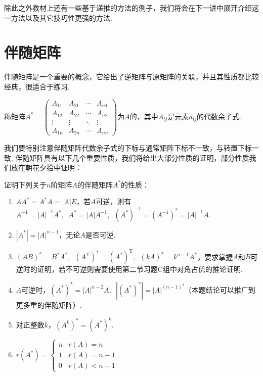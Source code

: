 除此之外教材上还有一些基于递推的方法的例子，我们将会在下一讲中展开介绍这一方法以及其它技巧性更强的方法.

\section{伴随矩阵}

伴随矩阵是一个重要的概念，它给出了逆矩阵与原矩阵的关联，并且其性质都比较经典，很适合于练习.
\begin{definition}
    称矩阵$A^*=\begin{pmatrix}
            A_{11} & A_{21} & \cdots & A_{n1} \\
            A_{12} & A_{22} & \cdots & A_{n2} \\
            \vdots & \vdots & \ddots & \vdots \\
            A_{1n} & A_{2n} & \cdots & A_{nn}
        \end{pmatrix}$为$A$的，其中$A_{ij}$是元素$a_{ij}$的代数余子式.
\end{definition}
我们要特别注意伴随矩阵代数余子式的下标与通常矩阵下标不一致，与转置下标一致. 伴随矩阵具有以下几个重要性质，我们将给出大部分性质的证明，部分性质我们放在朝花夕拾中证明：
\begin{example} \label{ex:13:伴随矩阵}
    证明下列关于$n$阶矩阵$A$的伴随矩阵$A^*$的性质：
    \begin{enumerate}
        \item \label{item:13:伴随矩阵:1}
              $AA^*=A^*A=|A|E$，若$A$可逆，则有$A^{-1}=|A|^{-1}A^*,\enspace A^*=|A|A^{-1},\enspace (A^*)^{-1}=(A^{-1})^*=|A|^{-1}A$.

        \item $|A^*|=|A|^{n-1}$，无论$A$是否可逆.

        \item \label{item:13:伴随矩阵:3}
              $(AB)^*=B^*A^*,\enspace (A^\mathrm{T})^*=(A^*)^\mathrm{T},\enspace (kA)^*=k^{n-1}A^*$，要求掌握$A$和$B$可逆时的证明，若不可逆则需要使用第二节习题C组中对角占优的推论证明.

        \item $A$可逆时，$(A^*)^*=|A|^{n-2}A,\enspace |(A^*)^*|=|A|^{(n-1)^2}$（本题结论可以推广到更多重的伴随矩阵）.

        \item 对正整数$k$，$(A^k)^*=(A^*)^k$.

        \item $r(A^*)=\begin{cases}
                      n & r(A)=n     \\
                      1 & r(A)=n-1   \\
                      0 & r(A) < n-1
                  \end{cases}$.
    \end{enumerate}
\end{example}

